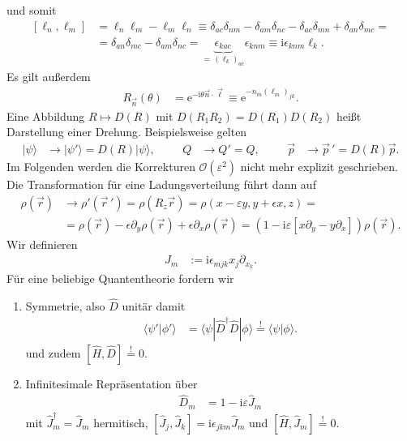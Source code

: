 \documentclass[english, parskip=full]{scrreport}
\newcommand{\brak}{}
\newcommand{\braket}{}
\newcommand{\kla}{}
\newcommand{\klam}{}
\newcommand{\Ket}{}
\renewcommand{\i}{\text{i}}
\newcommand{\e}{\text{e}}
\begin{document}
und somit
\begin{align}
\klam\left[ \ell_n,\ell_m \right] &= \ell_n\ell_m - \ell_m\ell_n \equiv \delta_{ac}\delta_{nm} - \delta_{am}\delta_{nc} - \delta_{ac}\delta_{mn} + \delta_{an}\delta_{mc} = \\
&= \delta_{an}\delta_{mc} - \delta_{am}\delta_{nc} = \underbrace{\epsilon_{kac}}_{=\,(\ell_k)_{ac}} \epsilon_{knm} \equiv \i\epsilon_{knm}\ell_k.
\end{align}
Es gilt außerdem
\begin{align}
R_{\vec{n}}(\theta) &= \e^{-\i\theta\vec{n}\cdot\vec{\ell}} \equiv \e^{-n_m(\ell_m)_{jk}}.
\end{align}
Eine Abbildung $R\mapsto D(R)$ mit $D(R_1R_2)=D(R_1)D(R_2)$ heißt Darstellung einer Drehung.
Beispielsweise gelten
\begin{align}
\Ket | \psi \rangle &\rightarrow \Ket | \psi' \rangle = D(R)\Ket | \psi \rangle, &&& Q&\rightarrow Q'=Q, &&&\vec{p}&\rightarrow \vec{p}\,'= D(R)\vec{p}.
\end{align}
Im Folgenden werden die Korrekturen $\mathcal{O}(\varepsilon^2)$ nicht mehr explizit geschrieben.
Die Transformation für eine Ladungsverteilung führt dann auf
\begin{align}
\rho(\vec{r}) &\rightarrow \rho'(\vec{r}\,') = \rho(R_z\vec{r}) = \rho(x-\varepsilon y, y + \epsilon x, z) = \\
&= \rho(\vec{r}) - \epsilon\partial_y\rho(\vec{r}) + \epsilon\partial_x\rho(\vec{r}) = \kla\left( 1 - \i\varepsilon\klam\left[ x\partial_y - y\partial_x \right] \right)\rho(\vec{r}).
\end{align}
Wir definieren
\begin{align}
J_m &:= \i\epsilon_{mjk}x_j\partial_{x_k}.
\end{align}
Für eine beliebige Quantentheorie fordern wir 
\begin{enumerate}
\item Symmetrie, also $\hat{D}$ unitär damit
\begin{align}
\brak\langle \psi' | \phi' \rangle &= \braket\langle \psi | \hat{D}^\dagger\hat{D} | \phi \rangle \overset{!}{=} \brak\langle \psi | \phi \rangle.
\end{align}
und zudem $\klam\left[ \hat{H},\hat{D} \right] \overset{!}{=} 0$.
\item Infinitesimale Repräsentation über
\begin{align}
\hat{D}_m &= 1 - \i\varepsilon\hat{J}_m
\end{align}
mit $\hat{J}_m^\dagger = \hat{J}_m$ hermitisch, $\klam\left[ \hat{J}_j, \hat{J}_k \right] = \i\epsilon_{jkm}\hat{J}_m$ und $\klam\left[ \hat{H}, \hat{J}_m \right] \overset{!}{=} 0$.
\end{enumerate}
\end{document}
